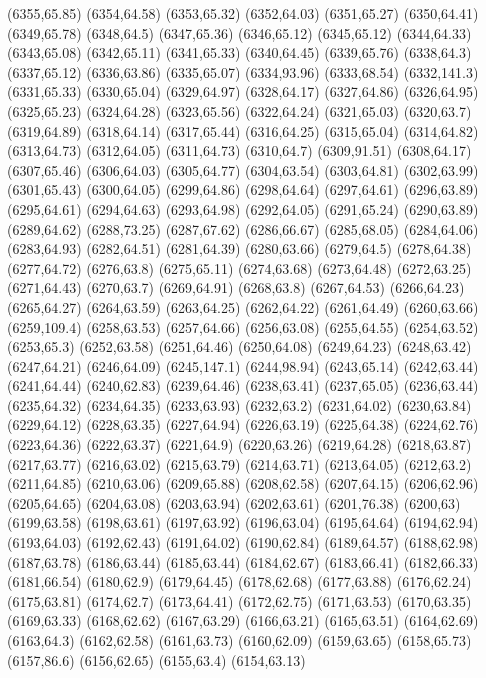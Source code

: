 (6355,65.85)
(6354,64.58)
(6353,65.32)
(6352,64.03)
(6351,65.27)
(6350,64.41)
(6349,65.78)
(6348,64.5)
(6347,65.36)
(6346,65.12)
(6345,65.12)
(6344,64.33)
(6343,65.08)
(6342,65.11)
(6341,65.33)
(6340,64.45)
(6339,65.76)
(6338,64.3)
(6337,65.12)
(6336,63.86)
(6335,65.07)
(6334,93.96)
(6333,68.54)
(6332,141.3)
(6331,65.33)
(6330,65.04)
(6329,64.97)
(6328,64.17)
(6327,64.86)
(6326,64.95)
(6325,65.23)
(6324,64.28)
(6323,65.56)
(6322,64.24)
(6321,65.03)
(6320,63.7)
(6319,64.89)
(6318,64.14)
(6317,65.44)
(6316,64.25)
(6315,65.04)
(6314,64.82)
(6313,64.73)
(6312,64.05)
(6311,64.73)
(6310,64.7)
(6309,91.51)
(6308,64.17)
(6307,65.46)
(6306,64.03)
(6305,64.77)
(6304,63.54)
(6303,64.81)
(6302,63.99)
(6301,65.43)
(6300,64.05)
(6299,64.86)
(6298,64.64)
(6297,64.61)
(6296,63.89)
(6295,64.61)
(6294,64.63)
(6293,64.98)
(6292,64.05)
(6291,65.24)
(6290,63.89)
(6289,64.62)
(6288,73.25)
(6287,67.62)
(6286,66.67)
(6285,68.05)
(6284,64.06)
(6283,64.93)
(6282,64.51)
(6281,64.39)
(6280,63.66)
(6279,64.5)
(6278,64.38)
(6277,64.72)
(6276,63.8)
(6275,65.11)
(6274,63.68)
(6273,64.48)
(6272,63.25)
(6271,64.43)
(6270,63.7)
(6269,64.91)
(6268,63.8)
(6267,64.53)
(6266,64.23)
(6265,64.27)
(6264,63.59)
(6263,64.25)
(6262,64.22)
(6261,64.49)
(6260,63.66)
(6259,109.4)
(6258,63.53)
(6257,64.66)
(6256,63.08)
(6255,64.55)
(6254,63.52)
(6253,65.3)
(6252,63.58)
(6251,64.46)
(6250,64.08)
(6249,64.23)
(6248,63.42)
(6247,64.21)
(6246,64.09)
(6245,147.1)
(6244,98.94)
(6243,65.14)
(6242,63.44)
(6241,64.44)
(6240,62.83)
(6239,64.46)
(6238,63.41)
(6237,65.05)
(6236,63.44)
(6235,64.32)
(6234,64.35)
(6233,63.93)
(6232,63.2)
(6231,64.02)
(6230,63.84)
(6229,64.12)
(6228,63.35)
(6227,64.94)
(6226,63.19)
(6225,64.38)
(6224,62.76)
(6223,64.36)
(6222,63.37)
(6221,64.9)
(6220,63.26)
(6219,64.28)
(6218,63.87)
(6217,63.77)
(6216,63.02)
(6215,63.79)
(6214,63.71)
(6213,64.05)
(6212,63.2)
(6211,64.85)
(6210,63.06)
(6209,65.88)
(6208,62.58)
(6207,64.15)
(6206,62.96)
(6205,64.65)
(6204,63.08)
(6203,63.94)
(6202,63.61)
(6201,76.38)
(6200,63)
(6199,63.58)
(6198,63.61)
(6197,63.92)
(6196,63.04)
(6195,64.64)
(6194,62.94)
(6193,64.03)
(6192,62.43)
(6191,64.02)
(6190,62.84)
(6189,64.57)
(6188,62.98)
(6187,63.78)
(6186,63.44)
(6185,63.44)
(6184,62.67)
(6183,66.41)
(6182,66.33)
(6181,66.54)
(6180,62.9)
(6179,64.45)
(6178,62.68)
(6177,63.88)
(6176,62.24)
(6175,63.81)
(6174,62.7)
(6173,64.41)
(6172,62.75)
(6171,63.53)
(6170,63.35)
(6169,63.33)
(6168,62.62)
(6167,63.29)
(6166,63.21)
(6165,63.51)
(6164,62.69)
(6163,64.3)
(6162,62.58)
(6161,63.73)
(6160,62.09)
(6159,63.65)
(6158,65.73)
(6157,86.6)
(6156,62.65)
(6155,63.4)
(6154,63.13)

